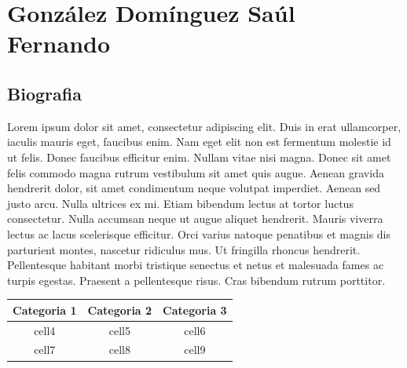 \chapter{González Domínguez Saúl Fernando}
\section{Biografia}
	Lorem ipsum dolor sit amet, consectetur adipiscing elit. Duis in erat 		ullamcorper, iaculis mauris eget, faucibus enim. Nam eget elit non est 		fermentum molestie id ut felis. Donec faucibus efficitur enim. Nullam 		vitae 		nisi magna. Donec sit amet felis commodo magna rutrum 			vestibulum sit amet quis augue. Aenean gravida hendrerit dolor, sit amet 		condimentum neque volutpat imperdiet. Aenean sed justo arcu. Nulla 			ultrices ex mi. Etiam bibendum lectus at tortor luctus consectetur. Nulla 	accumsan neque ut augue aliquet hendrerit. Mauris viverra lectus ac lacus 	scelerisque efficitur. Orci varius natoque penatibus et magnis dis 			parturient montes, nascetur ridiculus mus. Ut fringilla rhoncus   			hendrerit. Pellentesque habitant morbi tristique senectus et netus et  		malesuada fames ac turpis egestas. Praesent a pellentesque risus. Cras 		bibendum rutrum porttitor.
		\begin{center}
			\begin{tabular}{ |c|c|c| } 
 				\hline
 				Categoria 1 & Categoria 2 & Categoria 3 \\ 
				\hline 				
 				cell4 & cell5 & cell6 \\ 
				\hline 				
 				cell7 & cell8 & cell9 \\ 
 				\hline
			\end{tabular}
		\end{center}
